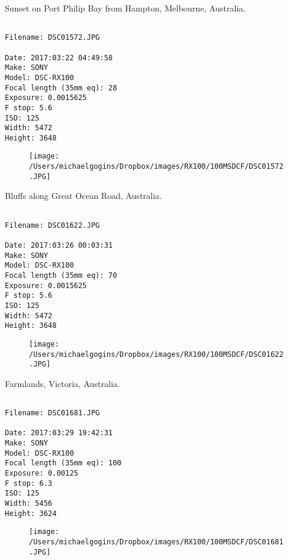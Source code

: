 \clearpage
\onecolumn
\noindent Sunset on Port Philip Bay from Hampton, Melbourne, Australia.
\noindent
\begin{lstlisting}

Filename: DSC01572.JPG

Date: 2017:03:22 04:49:58
Make: SONY
Model: DSC-RX100
Focal length (35mm eq): 28
Exposure: 0.0015625
F stop: 5.6
ISO: 125
Width: 5472
Height: 3648
\end{lstlisting}
\clearpage

\begin{figure}
\texttt{[image: /Users/michaelgogins/Dropbox/images/RX100/100MSDCF/DSC01572.JPG]}
\end{figure}
    
\clearpage
\onecolumn
\noindent Bluffs along Great Ocean Road, Australia.
\noindent
\begin{lstlisting}

Filename: DSC01622.JPG

Date: 2017:03:26 00:03:31
Make: SONY
Model: DSC-RX100
Focal length (35mm eq): 70
Exposure: 0.0015625
F stop: 5.6
ISO: 125
Width: 5472
Height: 3648
\end{lstlisting}
\clearpage

\begin{figure}
\texttt{[image: /Users/michaelgogins/Dropbox/images/RX100/100MSDCF/DSC01622.JPG]}
\end{figure}
    
\clearpage
\onecolumn
\noindent Farmlands, Victoria, Australia.
\noindent
\begin{lstlisting}

Filename: DSC01681.JPG

Date: 2017:03:29 19:42:31
Make: SONY
Model: DSC-RX100
Focal length (35mm eq): 100
Exposure: 0.00125
F stop: 6.3
ISO: 125
Width: 5456
Height: 3624
\end{lstlisting}
\clearpage

\begin{figure}
\texttt{[image: /Users/michaelgogins/Dropbox/images/RX100/100MSDCF/DSC01681.JPG]}
\end{figure}
    
